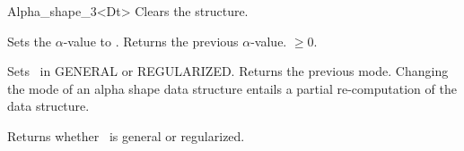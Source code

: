\begin{ccRefClass} {Alpha_shape_3<Dt>}
{Clears the structure.}

{Sets the $\alpha$-value to .
 Returns the previous $\alpha$-value.
\ccPrecond {} $\geq 0$.}

{Sets \ccVar\ in GENERAL  or REGULARIZED. 
Returns the previous mode. 
Changing the mode of an alpha shape data structure
entails a partial re-computation of the data structure.}

% 
% 
% 






{Returns whether \ccVar\ is general or regularized.}


\end{ccRefClass}
